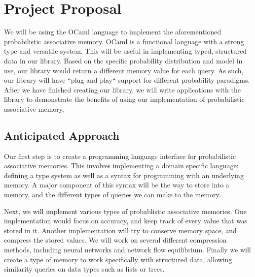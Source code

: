 \documentclass{sig-alternate}
\begin{document}


\section{Project Proposal}
\label{sec:project_proposal}
We will be using the OCaml language to implement the aforementioned probabilistic 
associative memory. OCaml is a functional language with a strong type and versatile
system. This will be useful in implementing typed, structured data in our library. 
Based on the specific probability distribution and model in use, our library would return 
a different memory value for each query. As such, our library will have ``plug and play`` support for 
different probability paradigms. After we have finished creating our library, we will 
write applications with the library to demonstrate the benefits of using our implementation
of probabilistic associative memory.


\subsection{Anticipated Approach}
\label{subsec:approach}

Our first step is to create a programming language interface for probabilistic
associative memories. This involves implementing a domain specific language: 
defining a type system as well as a syntax for programming with an underlying memory.
A major component of this syntax will be the way to store into a memory, 
and the different types of queries we can make to the memory.

Next, we will implement various types of probablistic associative memories.
One implementation would focus on accuracy, and keep track of every value that
was stored in it. Another implementation will try to conserve memory space,
and compress the stored values. We will work on several different compression methods,
including neural networks and network flow equilibrium. Finally we will create
a type of memory to work specifically with structured data, allowing similarity
queries on data types such as lists or trees.
\end{document}
